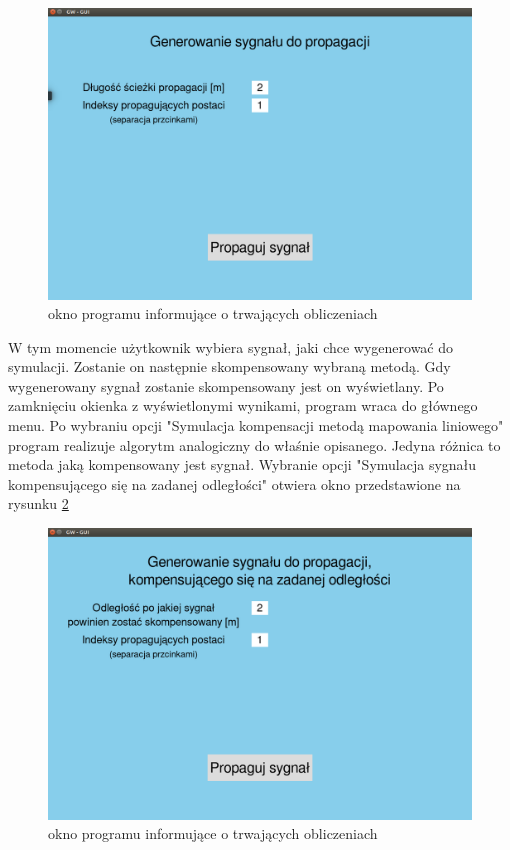 \begin{figure}[h]
\centering
\includegraphics[width=13cm]{Zdjecia/5/kasia/guiKomp1}
\caption{okno programu informujące o trwających obliczeniach}
\label{fig:guiKomp1}
\end{figure}

W tym momencie użytkownik wybiera sygnał, jaki chce wygenerować do symulacji. Zostanie on następnie skompensowany wybraną metodą. Gdy wygenerowany sygnał zostanie skompensowany jest on wyświetlany. Po zamknięciu okienka z wyświetlonymi wynikami, program wraca do głównego menu. Po wybraniu opcji "Symulacja kompensacji metodą mapowania liniowego" program realizuje algorytm analogiczny do właśnie opisanego. Jedyna różnica to metoda jaką kompensowany jest sygnał. Wybranie opcji "Symulacja sygnału kompensującego się na zadanej odległości" otwiera okno przedstawione na rysunku \ref{fig:guiLast}

\begin{figure}[h]
\centering
\includegraphics[width=13cm]{Zdjecia/5/kasia/guiLast}
\caption{okno programu informujące o trwających obliczeniach}
\label{fig:guiLast}
\end{figure}

